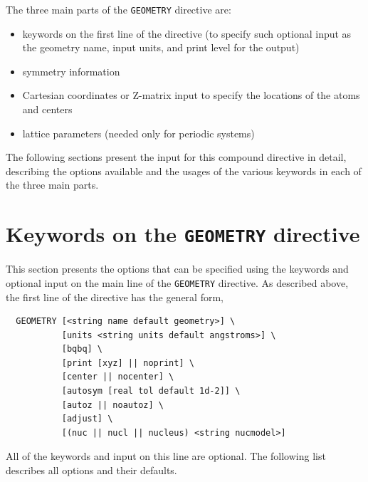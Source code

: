The three main parts of the \verb+GEOMETRY+ directive
are:

\begin{itemize}
\item keywords on the first line of the directive (to specify such optional
input as the geometry name, input units, and print level for the output)
\item symmetry information
\item Cartesian coordinates or Z-matrix input to specify the locations 
of the atoms and centers
\item lattice parameters (needed only for periodic systems)
\end{itemize}

The following sections present the input for this compound directive in
detail, describing the options available and the usages of the various
keywords in each of the three main parts.


\section{Keywords on the {\tt GEOMETRY} directive}
\label{sec:geomkeys}

This section presents the options that can be specified using the keywords 
and optional input on the main line of the {\tt GEOMETRY} directive.
As described above, the first line of the directive has the general form,
\begin{verbatim}
  GEOMETRY [<string name default geometry>] \
           [units <string units default angstroms>] \
           [bqbq] \
           [print [xyz] || noprint] \
           [center || nocenter] \
           [autosym [real tol default 1d-2]] \
           [autoz || noautoz] \
           [adjust] \
           [(nuc || nucl || nucleus) <string nucmodel>]
\end{verbatim}
    
All of the keywords and input on this line are optional.  The following
list describes  all options and their defaults.

